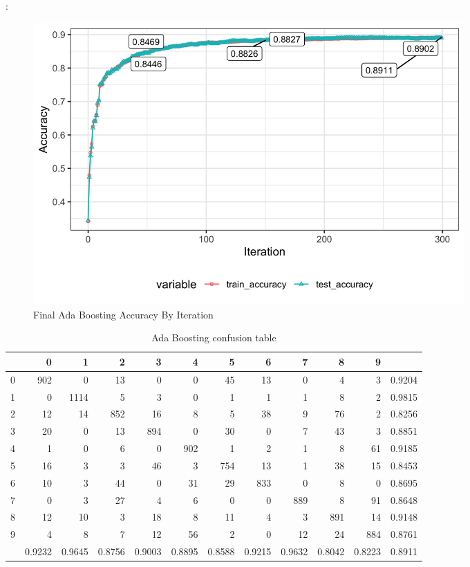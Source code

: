 \documentclass[8pt]{beamer}
\begin{document}
\begin{frame}[allowframebreaks]{\secname : \subsecname}{\subsubsecname}
\begin{figure}[htbp]
\centerline{\includegraphics[width=0.8\textwidth]{figure/Final Ada Boosting Accuracy By Iteration.png}}
\caption{Final Ada Boosting Accuracy By Iteration}
\label{Final Ada Boosting Accuracy By Iteration}
\end{figure}
\begin{table}[htbp]
\tiny
  \centering
  \caption{Ada Boosting confusion table}
\begin{tabular}{|r|rrrrrrrrrr|r|}
\hline
  & 0 & 1 & 2 & 3 & 4 & 5 & 6 & 7 & 8 & 9 &  \\
\hline
0 & 902 & 0 & 13 & 0 & 0 & 45 & 13 & 0 & 4 & 3 & 0.9204 \\
1 & 0 & 1114 & 5 & 3 & 0 & 1 & 1 & 1 & 8 & 2 & 0.9815 \\
2 & 12 & 14 & 852 & 16 & 8 & 5 & 38 & 9 & 76 & 2 & 0.8256 \\
3 & 20 & 0 & 13 & 894 & 0 & 30 & 0 & 7 & 43 & 3 & 0.8851 \\
4 & 1 & 0 & 6 & 0 & 902 & 1 & 2 & 1 & 8 & 61 & 0.9185 \\
5 & 16 & 3 & 3 & 46 & 3 & 754 & 13 & 1 & 38 & 15 & 0.8453 \\
6 & 10 & 3 & 44 & 0 & 31 & 29 & 833 & 0 & 8 & 0 & 0.8695 \\
7 & 0 & 3 & 27 & 4 & 6 & 0 & 0 & 889 & 8 & 91 & 0.8648 \\
8 & 12 & 10 & 3 & 18 & 8 & 11 & 4 & 3 & 891 & 14 & 0.9148 \\
9 & 4 & 8 & 7 & 12 & 56 & 2 & 0 & 12 & 24 & 884 & 0.8761 \\
\hline
  & 0.9232 & 0.9645 & 0.8756 & 0.9003 & 0.8895 & 0.8588 & 0.9215 & 0.9632 & 0.8042 & 0.8223 & 0.8911 \\
\hline
\end{tabular}%
 \label{tab:Ada Boosting confusion table}%
\end{table}%
\end{frame}
\end{document}
